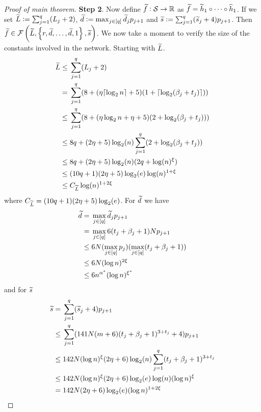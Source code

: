 \begin{proof}[Proof of main theorem]
  \textbf{Step 2}.
  Now define $\widetilde{f}:\mathcal{S} \to \mathbb{R}$
  as $\widetilde{f} = \widetilde{h}_1 \circ \dots \circ \widehat{h}_1$.
  If we set
  $\widetilde{L} \vcentcolon= \sum_{j=1}^q (L_j + 2)$,
  $\widetilde{d} \vcentcolon= \max_{j \in [q]} \widetilde{d}_j p_{j+1}$
  and $\widetilde{s} \vcentcolon= \sum_{j=1}^q (\widetilde{s}_j + 4) p_{j+1}$.
  Then $\widetilde{f} \in \mathcal{F}\left( \widetilde{L}, \left\{ 
  r, \widetilde{d}, \dots, \widetilde{d}, 1\right\}, \widetilde{s} \right)$.
  We now take a moment to verify the size 
  of the constants involved in the network.
  Starting with $\widetilde{L}$.
  \begin{align*}
    \widetilde{L} \leq & \; \sum_{j=1}^q (L_j + 2)
    \\ = & \; \sum_{j=1}^q (8 + (\eta \lceil\log_2 n\rceil + 5)
    (1 + \lceil\log_2(\beta_j + t_j)\rceil))
    \\ \leq & \; \sum_{j=1}^q (8 + (\eta \log_2 n + \eta + 5)
    (2 + \log_2(\beta_j + t_j)))
    \\ \leq & \; 8q + (2 \eta + 5) \log_2(n)
    \sum_{j=1}^q (2 + \log_2(\beta_j + t_j)) 
    \\ \leq & \; 8q + (2 \eta + 5) \log_2(n)
    (2q + \log(n)^\xi) 
    \\ \leq & \; (10q + 1) (2 \eta + 5) \log_2(e) \log(n)^{1 + \xi}
    \\ \leq & \; C_{\widetilde{L}} \log(n)^{1 + 2\xi}
  \end{align*}
  where $C_{\widetilde{L}} = (10q + 1)(2\eta + 5)\log_2(e)$.
  For $\widetilde{d}$ we have
  \begin{align*}
    \widetilde{d} = & \; \max_{j \in [q]} \widetilde{d}_j p_{j+1}
    \\ = & \; \max_{j \in [q]} 6(t_j + \beta_j + 1) N p_{j+1}
    \\ \leq & \; 6 N (\max_{j \in [q]} p_j)
    (\max_{j \in [q]} (t_j + \beta_j + 1))
    \\ \leq & \; 6 N (\log n)^{2 \xi}
    \\ \leq & \; 6 n^{\alpha^*} (\log n)^{\xi^*}
  \end{align*}
  and for $\widetilde{s}$
  \begin{align*}
    \wt{s} = & \; \sum_{j=1}^q (\wt{s}_j + 4) p_{j+1}
    \\ \leq & \; \sum_{j=1}^q (141 N (m + 6)
    (t_j + \beta_j + 1)^{3 + t_j} + 4) p_{j+1}
    \\ \leq & \; 142 N (\log n)^\xi (2 \eta + 6) \log_2(n)
    \sum_{j=1}^q (t_j + \beta_j + 1)^{3 + t_j}
    \\ \leq & \; 142 N (\log n)^\xi (2 \eta + 6) \log_2(e) \log(n)
    (\log n)^\xi
    \\ = & \; 142 N (2 \eta + 6) \log_2(e) (\log n)^{1+ 2\xi}

\end{align*}
\end{proof}
